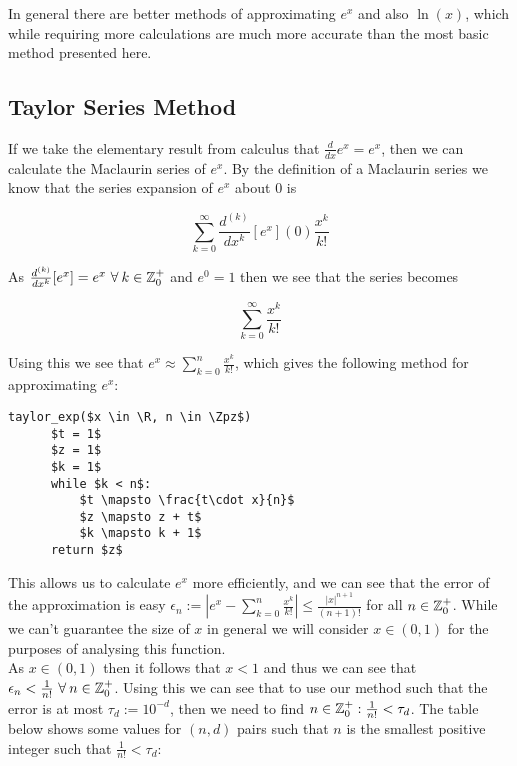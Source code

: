 In general there are better methods of approximating \(e^x\) and also \(\ln(x)\), which while requiring more calculations are much more accurate than the most basic method presented here.

\subsection{Taylor Series Method}

\theoremstyle{plain}
\newtheorem{nat log dif}{Proposition}[subsection]
\newtheorem{log convergence}[nat log dif]{Proposition}

If we take the elementary result from calculus that \(\frac{d}{dx}e^x = e^x\), then we can calculate the Maclaurin series of \(e^x\). By the definition of a Maclaurin series we know that the series expansion of \(e^x\) about 0 is 

\[\sum_{k=0}^\infty \frac{d^{(k)}}{dx^k}[e^x](0)\frac{x^k}{k!}\]

As \(\frac{d^{(k)}}{dx^k}[e^x] = e^x\ \forall\: k \in \Zpz\) and \(e^0 = 1\) then we see that the series becomes

\[\sum_{k=0}^\infty \frac{x^k}{k!}\]

Using this we see that \(e^x \approx \sum_{k=0}^n \frac{x^k}{k!}\), which gives the following method for approximating \(e^x\):

\begin{lstlisting}[caption={Taylor Method for calculating \(e^x\)},label={PCD_"taylor exp"}]
  taylor_exp($x \in \R, n \in \Zpz$)
      $t = 1$
      $z = 1$
      $k = 1$
      while $k < n$:
          $t \mapsto \frac{t\cdot x}{n}$
          $z \mapsto z + t$
          $k \mapsto k + 1$
      return $z$
\end{lstlisting}

This allows us to calculate \(e^x\) more efficiently, and we can see that the error of the approximation is easy \(\epsilon_n := |e^x - \sum_{k=0}^n\frac{x^k}{k!}| \le \frac{|x|^{n+1}}{(n+1)!}\) for all \(n \in \mathbb{Z}^+_0\). While we can't guarantee the size of \(x\) in general we will consider \(x \in (0,1)\) for the purposes of analysing this function.\\

As \(x \in (0,1)\) then it follows that \(x < 1\) and thus we can see that \(\epsilon_n < \frac{1}{n!}\ \forall\: n \in \mathbb{Z}^+_0\). Using this we can see that to use our method such that the error is at most \(\tau_d := 10^{-d}\), then we need to find \(n \in \mathbb{Z}^+_0 : \frac{1}{n!} < \tau_d\). The table below shows some values for \((n, d)\) pairs such that \(n\) is the smallest positive integer such that \(\frac{1}{n!} < \tau_d\):


